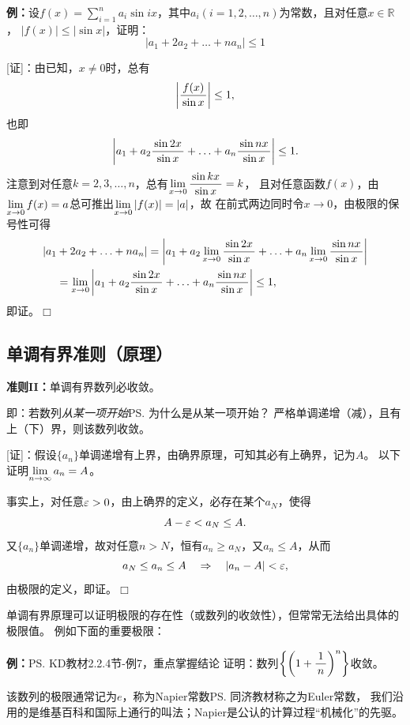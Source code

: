 {\bf 例：}设$f(x)=\sum\limits_{i=1}^na_i\sin
ix$，其中$a_i(i=1,2,\ldots,n)$为常数，且对任意$x\in\mathbb{R}$， $|f(x)|\leq |\sin x|$，证明：
$$\left|a_1+2a_2+\ldots+na_n\right|\leq 1$$

[证]：由已知，$x\ne 0$时，总有
$$\left|\displaystyle\frac{\,{f(x)}\,}{\,{\sin x}\,}\right|\leq 1,$$
也即
$$\left|a_1+a_2\displaystyle\frac{\,{\sin 2x}\,}{\,{\sin x}\,}+\ldots
+a_n\displaystyle\frac{\,{\sin nx}\,}{\,{\sin x}\,}\right|\leq 1.$$
注意到对任意$k=2,3,\ldots,n$，总有$\lim\limits_{x\to{0}}\displaystyle\frac{\,{\sin kx}\,}{\,{\sin x}\,}=k$，
且对任意函数$f(x)$，由$\lim\limits_{x\to{0}}f(x)=a$总可推出$\lim\limits_{x\to{0}}|f(x)|=|a|$，故
在前式两边同时令$x\to0$，由极限的保号性可得
\begin{align*}
	|a_1&+2a_2+\ldots+na_n|
	=\left|a_1+a_2\lim\limits_{x\to{0}}\displaystyle\frac{\,{\sin 2x}\,}{\,{\sin x}\,}+\ldots
	+a_n\lim\limits_{x\to{0}}\displaystyle\frac{\,{\sin nx}\,}{\,{\sin x}\,}\right|\\
	&=\lim\limits_{x\to{0}}\left|a_1+a_2\displaystyle\frac{\,{\sin 2x}\,}{\,{\sin x}\,}+\ldots
	+a_n\displaystyle\frac{\,{\sin nx}\,}{\,{\sin x}\,}\right|\leq 1,
\end{align*}
即证。\hfill$\Box$

\subsection{单调有界准则（原理）}

\begin{thx}
{\bf 准则II：}单调有界数列必收敛。
\end{thx}

即：若数列{\it 从某一项开始}\ps{为什么是从某一项开始？}
严格单调递增（减），且有上（下）界，则该数列收敛。

[证]：假设$\{a_n\}$单调递增有上界，由确界原理，可知其必有上确界，记为$A$。
以下证明$\lim\limits_{n\to\infty} a_n=A$。

事实上，对任意$\varepsilon>0$，由上确界的定义，必存在某个$a_N$，使得
$$A-\varepsilon<a_N\leq A.$$
又$\{a_n\}$单调递增，故对任意$n>N$，恒有$a_n\geq a_N$，又$a_n\leq A$，从而
$$a_N\leq a_n\leq A\quad\Rightarrow\quad |a_n-A|<\varepsilon,$$
由极限的定义，即证。\hfill $\Box$

单调有界原理可以证明极限的存在性（或数列的收敛性），但常常无法给出具体的极限值。
例如下面的重要极限：

{\bf 例：}\ps{KD教材2.2.4节-例7，重点掌握结论}
证明：数列$\left\{\left(1+\displaystyle\frac{\,{1}\,}{\,{n}\,}\right)^n\right\}$收敛。

该数列的极限通常记为$e$，称为{\kaishu Napier常数}\ps{同济教材称之为Euler常数，
我们沿用的是维基百科和国际上通行的叫法；Napier是公认的计算过程“机械化”的先驱}。

